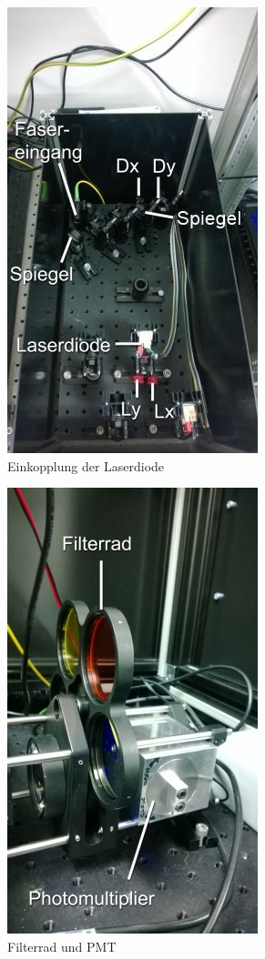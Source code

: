 \begin{figure}[H]
	\centering
\includegraphics[width=0.5\linewidth]{IMAGE/einkopplung.jpeg}
	\caption{Einkopplung der Laserdiode}
	\label{fig:einkopplung}
\end{figure} 

\begin{figure}[H]
	\centering
\includegraphics[width=0.5\linewidth]{IMAGE/pmt.png}
	\caption{Filterrad und PMT}
	\label{fig:pmt}
\end{figure} 


